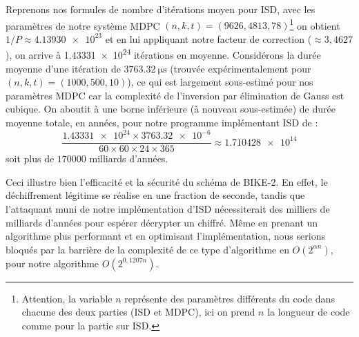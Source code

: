 \documentclass[11pt,a4paper]{article}
\begin{document}
Reprenons nos formules de nombre d'itérations moyen pour ISD, avec les
paramètres de notre système MDPC $(n, k, t) = (9626, 4813,
78)$\footnote{Attention, la variable $n$ représente des paramètres différents du
code dans chacune des deux parties (ISD et MDPC), ici on prend $n$ la longueur de
code comme pour la partie sur ISD.}
on obtient $1/P \approx \num{4.13930e+23}$ et en lui appliquant notre facteur de
correction ($\approx 3,4627$), on arrive à \num{1.43331e+24} itérations en
moyenne.
Considérons la durée moyenne d'une itération de
$\qty{3763.32}{\micro\second}$ (trouvée expérimentalement pour $(n, k, t) =
(1000, 500, 10)$), ce qui est largement sous-estimé pour nos paramètres MDPC car
la complexité de l'inversion par élimination de Gauss est cubique.
On aboutit à une borne inférieure (à nouveau sous-estimée) de durée moyenne
totale, en années, pour notre programme implémentant ISD de :
\begin{equation*}
    \frac{\num{1.43331e+24} \times \num{3763.32e-6}}{60 \times 60 \times 24 \times 365}
    \approx \num{1.710428e+14}
\end{equation*}
soit plus de $\num[round-mode=none]{170000}$ milliards d'années.

Ceci illustre bien l'efficacité et la sécurité du schéma de BIKE-2.
En effet, le déchiffrement légitime se réalise en une fraction de seconde,
tandis que l'attaquant muni de notre implémentation d'ISD nécessiterait des
milliers de milliards d'années pour espérer décrypter un chiffré.
Même en prenant un algorithme plus performant et en optimisant l'implémentation,
nous serions bloqués par la barrière de la complexité de ce type d'algorithme en
$O(2^{\alpha n})$, pour notre algorithme $O(2^{0,1207n})$.
\end{document}
